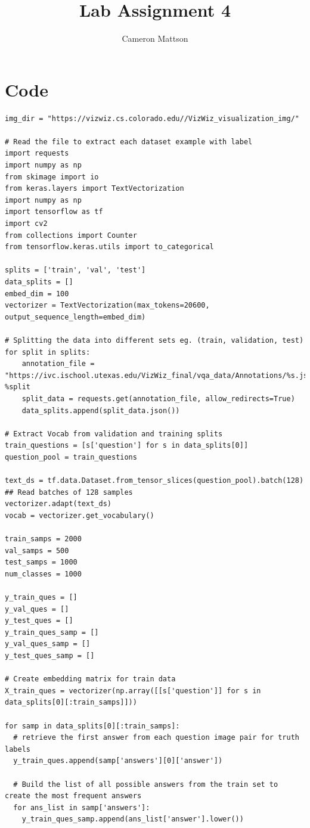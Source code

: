 \documentclass[12pt]{article}
\title{Lab Assignment 4}
\author{Cameron Mattson}
\begin{document}
\maketitle
\tableofcontents
\section{Code}
\begin{lstlisting}[breaklines=true]
img_dir = "https://vizwiz.cs.colorado.edu//VizWiz_visualization_img/"

# Read the file to extract each dataset example with label
import requests
import numpy as np
from skimage import io
from keras.layers import TextVectorization
import numpy as np
import tensorflow as tf
import cv2
from collections import Counter
from tensorflow.keras.utils import to_categorical

splits = ['train', 'val', 'test']
data_splits = []
embed_dim = 100
vectorizer = TextVectorization(max_tokens=20600, output_sequence_length=embed_dim)

# Splitting the data into different sets eg. (train, validation, test)
for split in splits:
    annotation_file = "https://ivc.ischool.utexas.edu/VizWiz_final/vqa_data/Annotations/%s.json" %split
    split_data = requests.get(annotation_file, allow_redirects=True)
    data_splits.append(split_data.json())

# Extract Vocab from validation and training splits
train_questions = [s['question'] for s in data_splits[0]]
question_pool = train_questions

text_ds = tf.data.Dataset.from_tensor_slices(question_pool).batch(128) ## Read batches of 128 samples
vectorizer.adapt(text_ds)
vocab = vectorizer.get_vocabulary()

train_samps = 2000
val_samps = 500
test_samps = 1000
num_classes = 1000

y_train_ques = []
y_val_ques = []
y_test_ques = []
y_train_ques_samp = []
y_val_ques_samp = []
y_test_ques_samp = []

# Create embedding matrix for train data
X_train_ques = vectorizer(np.array([[s['question']] for s in data_splits[0][:train_samps]]))

for samp in data_splits[0][:train_samps]:
  # retrieve the first answer from each question image pair for truth labels
  y_train_ques.append(samp['answers'][0]['answer'])

  # Build the list of all possible answers from the train set to create the most frequent answers
  for ans_list in samp['answers']:
    y_train_ques_samp.append(ans_list['answer'].lower())


\end{lstlisting}
\end{document}
